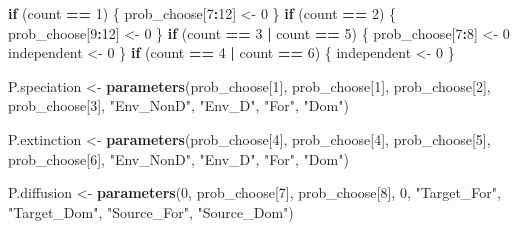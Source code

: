 \documentclass[]{book}
\newenvironment{Shaded}{\begin{snugshade}}{\end{snugshade}}
\newcommand{\KeywordTok}[1]{\textcolor[rgb]{0.13,0.29,0.53}{\textbf{{#1}}}}
\newcommand{\DecValTok}[1]{\textcolor[rgb]{0.00,0.00,0.81}{{#1}}}
\newcommand{\StringTok}[1]{\textcolor[rgb]{0.31,0.60,0.02}{{#1}}}
\newcommand{\ControlFlowTok}[1]{\textcolor[rgb]{0.13,0.29,0.53}{\textbf{{#1}}}}
\newcommand{\OperatorTok}[1]{\textcolor[rgb]{0.81,0.36,0.00}{\textbf{{#1}}}}
\newcommand{\NormalTok}[1]{{#1}}
\theoremstyle{definition}
\theoremstyle{definition}
\theoremstyle{definition}
\theoremstyle{remark}
\begin{document}
\begin{Shaded}
\begin{Highlighting}[]
        
    \ControlFlowTok{if}\NormalTok{ (count }\OperatorTok{==}\StringTok{ }\DecValTok{1}\NormalTok{) \{}
\NormalTok{      prob_choose[}\DecValTok{7}\OperatorTok{:}\DecValTok{12}\NormalTok{] <-}\StringTok{ }\DecValTok{0}
\NormalTok{    \}}
    \ControlFlowTok{if}\NormalTok{ (count }\OperatorTok{==}\StringTok{ }\DecValTok{2}\NormalTok{) \{}
\NormalTok{      prob_choose[}\DecValTok{9}\OperatorTok{:}\DecValTok{12}\NormalTok{] <-}\StringTok{ }\DecValTok{0}
\NormalTok{    \}}
    \ControlFlowTok{if}\NormalTok{ (count }\OperatorTok{==}\StringTok{ }\DecValTok{3} \OperatorTok{|}\StringTok{ }\NormalTok{count }\OperatorTok{==}\StringTok{ }\DecValTok{5}\NormalTok{) \{}
\NormalTok{      prob_choose[}\DecValTok{7}\OperatorTok{:}\DecValTok{8}\NormalTok{] <-}\StringTok{ }\DecValTok{0}
\NormalTok{      independent <-}\StringTok{ }\DecValTok{0}
\NormalTok{    \}}
    \ControlFlowTok{if}\NormalTok{ (count }\OperatorTok{==}\StringTok{ }\DecValTok{4} \OperatorTok{|}\StringTok{ }\NormalTok{count }\OperatorTok{==}\StringTok{ }\DecValTok{6}\NormalTok{) \{}
\NormalTok{      independent <-}\StringTok{ }\DecValTok{0}
\NormalTok{    \}}
    
    
\NormalTok{    P.speciation <-}\StringTok{ }\KeywordTok{parameters}\NormalTok{(prob_choose[}\DecValTok{1}\NormalTok{], prob_choose[}\DecValTok{1}\NormalTok{],}
\NormalTok{                               prob_choose[}\DecValTok{2}\NormalTok{], prob_choose[}\DecValTok{3}\NormalTok{],}
                               \StringTok{"Env_NonD"}\NormalTok{, }\StringTok{"Env_D"}\NormalTok{, }\StringTok{"For"}\NormalTok{, }\StringTok{"Dom"}\NormalTok{)}

\NormalTok{    P.extinction  <-}\StringTok{ }\KeywordTok{parameters}\NormalTok{(prob_choose[}\DecValTok{4}\NormalTok{], prob_choose[}\DecValTok{4}\NormalTok{],}
\NormalTok{                                prob_choose[}\DecValTok{5}\NormalTok{], prob_choose[}\DecValTok{6}\NormalTok{],}
                                \StringTok{"Env_NonD"}\NormalTok{, }\StringTok{"Env_D"}\NormalTok{, }\StringTok{"For"}\NormalTok{, }\StringTok{"Dom"}\NormalTok{)}

    
\NormalTok{    P.diffusion <-}\StringTok{ }\KeywordTok{parameters}\NormalTok{(}\DecValTok{0}\NormalTok{, prob_choose[}\DecValTok{7}\NormalTok{],}
\NormalTok{                              prob_choose[}\DecValTok{8}\NormalTok{], }\DecValTok{0}\NormalTok{,}
                              \StringTok{"Target_For"}\NormalTok{, }\StringTok{"Target_Dom"}\NormalTok{,}
                              \StringTok{"Source_For"}\NormalTok{, }\StringTok{"Source_Dom"}\NormalTok{)}
    

\end{Highlighting}
\end{Shaded}
\end{document}
